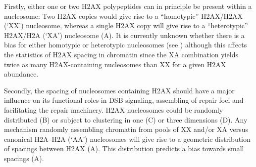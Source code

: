 Firstly, either one or two H2AX polypeptides can in principle be present within a nucleosome: Two
H2AX copies would give rise to a ``homotypic'' H2AX/H2AX (`XX') nucleosome, whereas a single H2AX
copy will give rise to a ``heterotypic'' H2AX/H2A (`XA') nucleosome (A).
It is currently unknown whether there is a bias for either homotypic or heterotypic nucleosomes
(see ) although this affects the statistics of H2AX spacing in
chromatin since the XA combination yields twice as many H2AX-containing nucleosomes than XX for a
given H2AX abundance.

Secondly, the spacing of nucleosomes containing H2AX should have a major influence on its functional
roles in DSB signaling, assembling of repair foci and facilitating the repair machinery. H2AX
nucleosomes could be randomly distributed (B) or subject to clustering
in one (C) or three dimensions (D). Any
mechanism randomly assembling chromatin from pools of XX and/or XA versus canonical H2A--H2A (`AA')
nucleosomes will give rise to a geometric distribution of spacings between H2AX (A).
This distribution predicts a bias towards small spacings (A).

